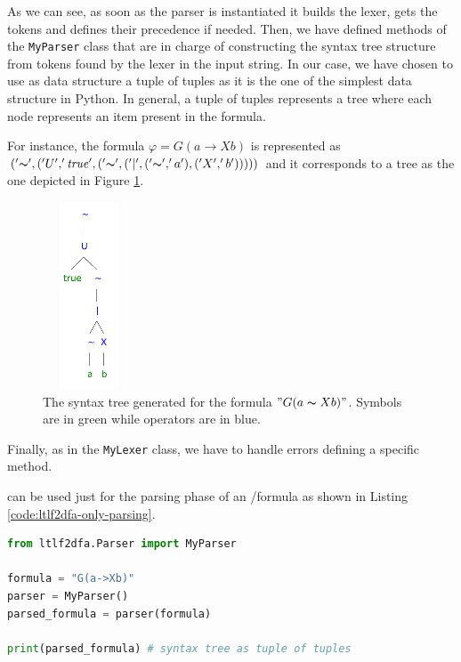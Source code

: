 As we can see, as soon as the parser is instantiated it builds the lexer, gets the tokens and defines their precedence if needed. Then, we have defined methods of the \texttt{MyParser} class that are in charge of constructing the syntax tree structure from tokens found by the lexer in the input string. In our case, we have chosen to use as data structure a tuple of tuples as it is the one of the simplest data structure in Python. In general, a tuple of tuples represents a tree where each node represents an item present in the formula.

For instance, the \LTLf formula $\varphi= G(a \rightarrow X b)$ is represented as $('\thicksim', ('U', '\mathit{true}', ('\thicksim',('|', ('\thicksim', 'a'), ('X', 'b')))))$ and it corresponds to a tree as the one depicted in Figure \ref{fig:formula-syntax-tree}.
\begin{figure}[h]
	\centering
	\includegraphics[height=15em, width=7.5em]{images/formula-syntax-tree}
	\caption{The syntax tree generated for the formula $"G(a \thicksim Xb)"$. Symbols are in green while operators are in blue.}
	\label{fig:formula-syntax-tree}
\end{figure}
Finally, as in the \texttt{MyLexer} class, we have to handle errors defining a specific method.

\LTLfToDFA can be used just for the parsing phase of an 	\LTLf/\PLTL formula as shown in Listing \ref{code:ltlf2dfa-only-parsing}.
\begin{lstlisting}[language=Python, style=Python, label={code:ltlf2dfa-only-parsing}, caption={How to use only the parsing phase of \LTLfToDFA.}]
from ltlf2dfa.Parser import MyParser

formula = "G(a->Xb)"
parser = MyParser()
parsed_formula = parser(formula)

print(parsed_formula) # syntax tree as tuple of tuples
\end{lstlisting}
